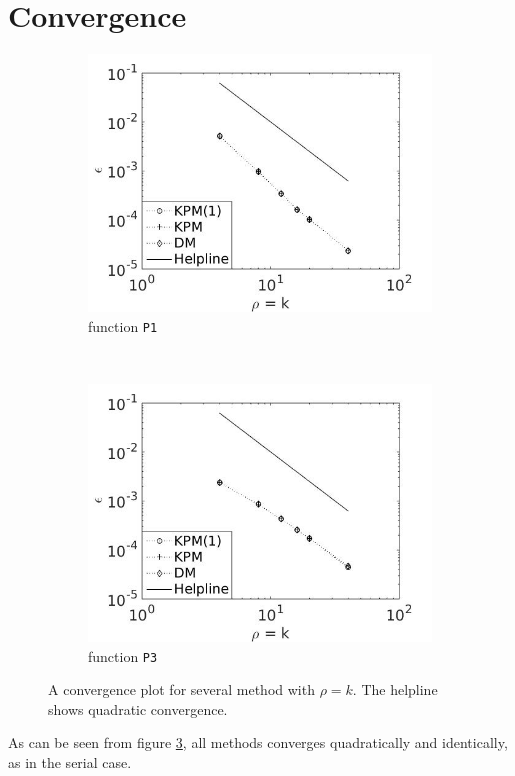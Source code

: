 \section{Convergence} \label{sec:pconv}
\begin{figure}[H]
        \centering
        \begin{subfigure}[b]{0.45\textwidth}
                \includegraphics[width=\textwidth]{fig/p1conv1}
                \caption{function \texttt{P1}}
                \label{fig:conv1p}
        \end{subfigure}%
        ~
        \begin{subfigure}[b]{0.45\textwidth}
                \includegraphics[width=\textwidth]{fig/p2conv2}
                \caption{function \texttt{P3}}
                \label{fig:conv2p}
        \end{subfigure}
        \caption{A convergence plot for several method with $\rho = k$. The helpline shows quadratic convergence.}\label{fig:convp}
\end{figure}
As can be seen from figure \ref{fig:convp}, all methods converges quadratically and identically, as in the serial case. 
